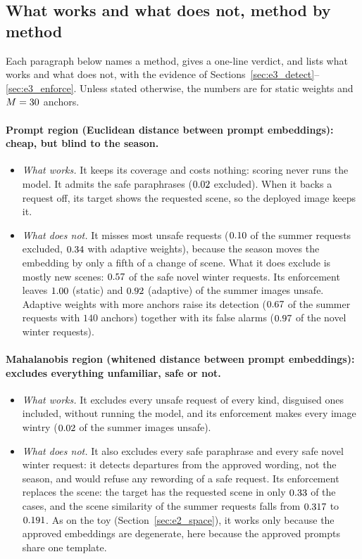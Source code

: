 \documentclass{article}
\theoremstyle{plain}
\theoremstyle{remark}
\begin{document}
\subsection{What works and what does not, method by method}\label{sec:e3_verdict}

Each paragraph below names a method, gives a one-line verdict, and lists what works and what does not, with the evidence of
Sections~\ref{sec:e3_detect}--\ref{sec:e3_enforce}. Unless stated otherwise, the numbers are for static weights and $M=30$ anchors.

\paragraph{Prompt region (Euclidean distance between prompt embeddings): cheap, but blind to the season.}
\begin{itemize}
\item \emph{What works.} It keeps its coverage and costs nothing: scoring never runs the model. It admits the safe paraphrases
($0.02$ excluded). When it backs a request off, its target shows the requested scene, so the deployed image keeps it.
\item \emph{What does not.} It misses most unsafe requests ($0.10$ of the summer requests excluded, $0.34$ with adaptive
weights), because the season moves the embedding by only a fifth of a change of scene. What it does exclude is mostly new scenes:
$0.57$ of the safe novel winter requests. Its enforcement leaves $1.00$ (static) and $0.92$ (adaptive) of the
summer images unsafe. Adaptive weights with more anchors raise its detection ($0.67$ of the summer requests with $140$
anchors) together with its false alarms ($0.97$ of the novel winter requests).
\end{itemize}

\paragraph{Mahalanobis region (whitened distance between prompt embeddings): excludes everything unfamiliar, safe or not.}
\begin{itemize}
\item \emph{What works.} It excludes every unsafe request of every kind, disguised ones included, without running the model, and
its enforcement makes every image wintry ($0.02$ of the summer images unsafe).
\item \emph{What does not.} It also excludes every safe paraphrase and every safe novel winter request: it detects departures from
the approved wording, not the season, and would refuse any rewording of a safe request. Its enforcement replaces the scene: the
target has the requested scene in only $0.33$ of the cases, and the scene similarity of the summer requests falls from
$0.317$ to $0.191$. As on the toy (Section~\ref{sec:e2_space}), it works only because the approved embeddings are
degenerate, here because the approved prompts share one template.
\end{itemize}
\end{document}
